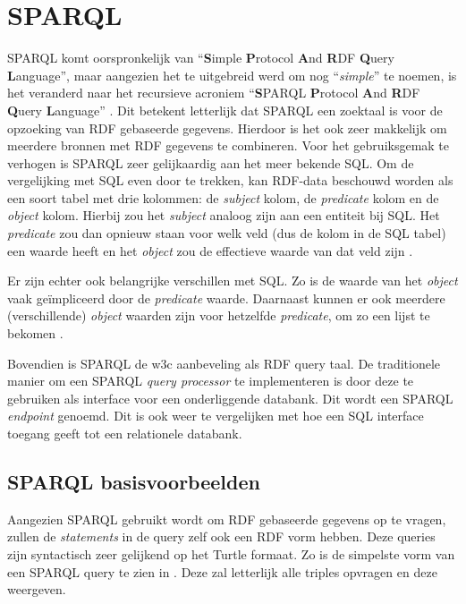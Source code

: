 \section{SPARQL}
\label{sec:sparql}

SPARQL komt oorspronkelijk van ``\textbf{S}imple \textbf{P}rotocol \textbf{A}nd \textbf{R}DF \textbf{Q}uery \textbf{L}anguage'', maar aangezien het te uitgebreid werd om nog ``\textit{simple}'' te noemen, is het veranderd naar het recursieve acroniem ``\textbf{S}PARQL \textbf{P}rotocol \textbf{A}nd \textbf{R}DF \textbf{Q}uery \textbf{L}anguage'' \cite{sparql2011acronym}. Dit betekent letterlijk dat SPARQL een zoektaal is voor de opzoeking van RDF gebaseerde gegevens. Hierdoor is het ook zeer makkelijk om meerdere bronnen met RDF gegevens te combineren. Voor het gebruiksgemak te verhogen is SPARQL zeer gelijkaardig aan het meer bekende SQL. Om de vergelijking met SQL even door te trekken, kan RDF-data beschouwd worden als een soort tabel met drie kolommen: de \textit{subject} kolom, de \textit{predicate} kolom en de \textit{object} kolom. Hierbij zou het \textit{subject} analoog zijn aan een entiteit bij SQL. Het \textit{predicate} zou dan opnieuw staan voor welk veld (dus de kolom in de SQL tabel) een waarde heeft en het \textit{object} zou de effectieve waarde van dat veld zijn \cite{sparql2013querylanguage}. 

Er zijn echter ook belangrijke verschillen met SQL. Zo is de waarde van het \textit{object} vaak geïmpliceerd door de \textit{predicate} waarde. Daarnaast kunnen er ook meerdere (verschillende) \textit{object} waarden zijn voor hetzelfde \textit{predicate}, om zo een lijst te bekomen \cite{sparql2013querylanguage}.

Bovendien is SPARQL de \acrshort{w3c} aanbeveling als RDF query taal. De traditionele manier om een SPARQL \textit{query processor} te implementeren is door deze te gebruiken als interface voor een onderliggende databank. Dit wordt een SPARQL \textit{endpoint} genoemd. Dit is ook weer te vergelijken met hoe een SQL interface toegang geeft tot een relationele databank.

\subsection{SPARQL basisvoorbeelden}

Aangezien SPARQL gebruikt wordt om RDF gebaseerde gegevens op te vragen, zullen de \textit{statements} in de query zelf ook een RDF vorm hebben. Deze queries zijn syntactisch zeer gelijkend op het Turtle formaat. Zo is de simpelste vorm van een SPARQL query te zien in . Deze zal letterlijk alle triples opvragen en deze weergeven. 

